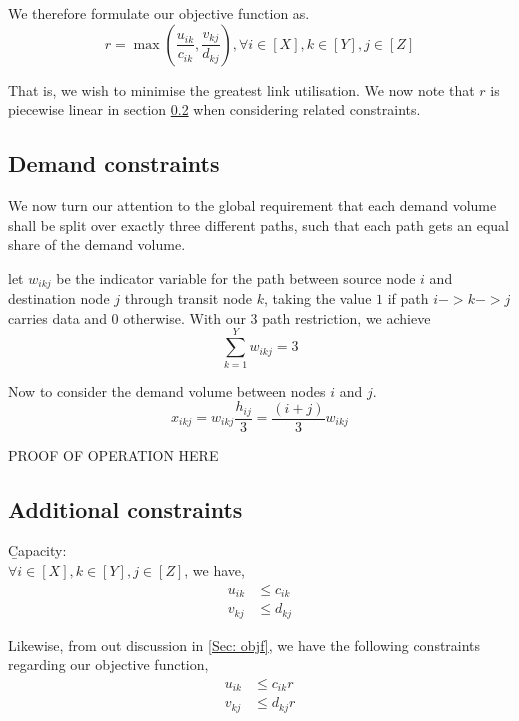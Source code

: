 \documentclass[12pt,twoside]{article}
\begin{document}
We therefore formulate our objective function as.
\begin{equation*}\label{2}
	r = \max(\frac{u_{ik}}{c_{ik}},\frac{v_{kj}}{d_{kj}}), \forall i \in [X], k \in [Y], j \in [Z]
\end{equation*}

That is, we wish to minimise the greatest link utilisation. We now note that $r$ is piecewise linear in section \ref{Sec: Const} when considering related constraints.

\subsection{Demand constraints}
We now turn our attention to the global requirement that each demand volume shall be split over exactly three different paths, such that each path gets an equal
share of the demand volume.

let $w_{ikj}$ be the indicator variable for the path between source node $i$ and destination node $j$ through transit node $k$, taking the value $1$ if path $i->k->j$ carries data and $0$ otherwise. With our 3 path restriction, we achieve
\begin{equation}
	\sum_{k=1}^{Y}w_{ikj} = 3
\end{equation}

Now to consider the demand volume between nodes $i$ and $j$.
\begin{equation}
	x_{ikj} = w_{ikj} \frac{h_{ij}}{3} = \frac{(i + j)}{3}w_{ikj}
\end{equation}

PROOF OF OPERATION HERE

\subsection{Additional constraints}\label{Sec: Const} 
\b{Capacity}:\\
$\forall i \in [X], k \in [Y], j \in [Z]$, we have,
\begin{align}
	u_{ik} &\leq c_{ik} \\
	v_{kj} &\leq d_{kj}  
\end{align}

Likewise, from out discussion in \ref{Sec: objf}, we have the following constraints regarding our objective function,
\begin{align}
	u_{ik} &\leq c_{ik} r\\
	v_{kj} &\leq d_{kj} r
\end{align}
\end{document}
